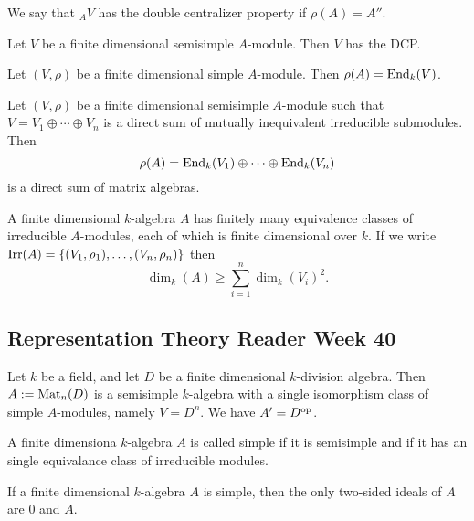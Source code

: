 \begin{defn}
We say that \(_AV\) has the double centralizer property if \(\rho (A)=A''\).
\end{defn}

\begin{thm}
Let \(V\) be a finite dimensional semisimple \(A\)-module. Then \(V\) has the DCP.
\end{thm}

\begin{thm}
Let \((V,\rho )\) be a finite dimensional simple \(A\)-module. Then \(\rho (A)=\operatorname{End}_{k}(V)\).
\end{thm}

\begin{thm}
Let \((V,\rho )\) be a finite dimensional semisimple \(A\)-module such that
\(V=V_{1}\oplus \cdots \oplus V_{n}\) is a direct sum of mutually inequivalent irreducible submodules. Then
\[
\rho (A)=\operatorname{End}_{k}(V_{1})\oplus \cdots \oplus \operatorname{End}_{k}(V_{n})
\]
is a direct sum of matrix algebras.
\end{thm}

\begin{thm}
A finite dimensional \(k\)-algebra \(A\) has finitely many equivalence classes of irreducible \(A\)-modules, each of which is finite dimensional over \(k\). If we write \(\operatorname{Irr}(A)=\{(V_{1},\rho _{1}),\ldots ,(V_{n},\rho _{n})\}\) then
\[
\dim_{k}(A)\geq \sum _{i=1}^n\dim_{k}(V_{i})^2.
\]
\end{thm}

\subsection{Representation Theory Reader Week 40}
\begin{thm}
Let \(k\) be a field, and let \(D\) be a finite dimensional \(k\)-division algebra. Then \(A:=\operatorname{Mat}_{n}(D)\) is a semisimple \(k\)-algebra with a single isomorphism class of simple \(A\)-modules, namely \(V=D^n\). We have \(A'=D^{\operatorname{op}}\).
\end{thm}

\begin{defn}
A finite dimensiona \(k\)-algebra \(A\) is called simple if it is semisimple and if it has an single equivalance class of irreducible modules.
\end{defn}

\begin{thm}
If a finite dimensional \(k\)-algebra \(A\) is simple, then the only two-sided ideals of \(A\) are \(0\) and \(A\).
\end{thm}

